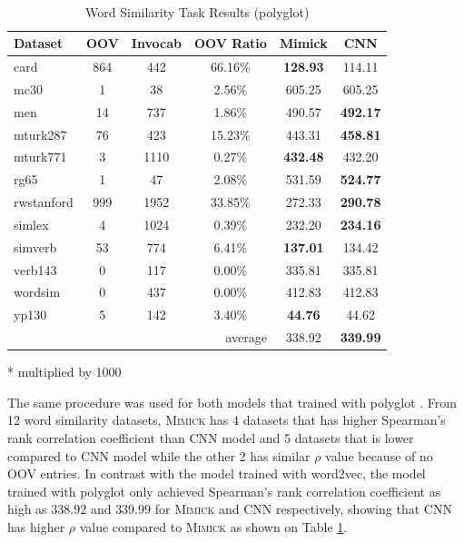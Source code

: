     \begin{table}[!ht]
      \begin{threeparttable} 
      \begin{center}
        \caption{Word Similarity Task Results (polyglot)}
        ~\\
        \label{tab:wordsim:polyglot}
        \begin{tabular}{l|c|c|c|c|c}
          \textbf{Dataset} & \textbf{OOV} & \textbf{Invocab} & \textbf{OOV Ratio} & \textbf{Mimick}\tnote{*} & \textbf{CNN}\tnote{*}\\
          \hline
          card & 864 & 442 & 66.16\% & \textbf{128.93} & 114.11\\
          mc30 & 1 & 38 & 2.56\% & 605.25 & 605.25\\
          men & 14 & 737 & 1.86\% & 490.57 & \textbf{492.17}\\
          mturk287 & 76 & 423 & 15.23\% & 443.31 & \textbf{458.81}\\
          mturk771 & 3 & 1110 & 0.27\% & \textbf{432.48} & 432.20\\
          rg65 & 1 & 47 & 2.08\% & 531.59 & \textbf{524.77}\\
          rwstanford & 999 & 1952 & 33.85\% & 272.33 & \textbf{290.78}\\
          simlex & 4 & 1024 & 0.39\% & 232.20 & \textbf{234.16}\\
          simverb & 53 & 774 & 6.41\% & \textbf{137.01} & 134.42\\
          verb143 & 0 & 117 & 0.00\% & 335.81 & 335.81\\
          wordsim & 0 & 437 & 0.00\% & 412.83 & 412.83\\
          yp130 & 5 & 142 & 3.40\% & \textbf{44.76} & 44.62\\
          \hline
          \multicolumn{4}{r|}{average} & 338.92 & \textbf{339.99}\\
        \end{tabular}
        \begin{tablenotes}
          \item[*] multiplied by 1000
        \end{tablenotes}
      \end{center}
    \end{threeparttable} 
    \end{table}

    The same procedure was used for both models that trained with
    polyglot \citep{polyglot2013alrfou}. From 12 word similarity
    datasets, \textsc{Mimick} has 4 datasets that has higher
    Spearman's rank correlation coefficient than CNN model and 5
    datasets that is lower compared to CNN model while the other 2 has
    similar $\rho$ value because of no OOV entries. In contrast with
    the model trained with word2vec, the model trained with polyglot
    \citep{polyglot2013alrfou} only achieved Spearman's rank
    correlation coefficient as high as $338.92$ and $339.99$ for
    \textsc{Mimick} and CNN respectively, showing that CNN has higher
    $\rho$ value compared to \textsc{Mimick} as shown on Table
    \ref{tab:wordsim:polyglot}.

